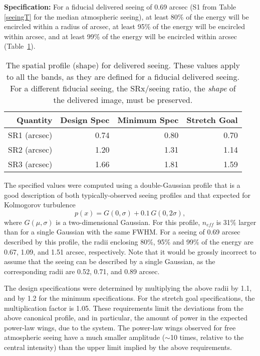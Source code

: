 {\bf Specification:} For a fiducial delivered seeing of 0.69 arcsec
(S1 from Table \ref{seeingT} for the median atmospheric seeing), at least 80\%
of the energy will be encircled within a radius of
arcsec, at least 95\% of the energy will be encircled within
arcsec, and at least 99\% of the energy will be encircled within
arcsec
(Table~\ref{Tspatprof}).

\begin{table}[h]
\begin{tabular}{|r|r|r|r|}
\hline
       Quantity    & Design Spec & Minimum Spec & Stretch Goal \\
\hline
      SR1 (arcsec) &    0.74       &   0.80       &   0.70        \\
      SR2 (arcsec) &    1.20       &   1.31       &   1.14        \\
      SR3 (arcsec) &    1.66       &   1.81       &   1.59        \\
\hline
\end{tabular}
\caption{The spatial profile (shape) for delivered seeing. These values
  apply to all the bands, as they are defined for a
  fiducial delivered seeing. For a different fiducial seeing, the
  SRx/seeing ratio, \ie the {\it shape} of the delivered image,
  must be preserved.}
\label{Tspatprof}
\end{table}

The specified values were computed using a double-Gaussian profile that is
a good description of both typically-observed seeing profiles and that
expected for Kolmogorov turbulence
\begin{equation}
       p(x) = G(0,\sigma) + 0.1\, G(0,2\sigma),
\end{equation}
where $G(\mu,\sigma)$ is a two-dimensional Gaussian. For this profile,
$n_{eff}$ is 31\% larger than for a single Gaussian with the same FWHM. For
a seeing of 0.69 arcsec described by this profile, the radii enclosing
80\%, 95\% and 99\% of the energy are 0.67, 1.09, and 1.51 arcsec,
respectively. Note that it would be grossly incorrect to assume that the
seeing can be described by a single Gaussian, as the corresponding radii
are 0.52, 0.71, and 0.89 arcsec.

The design specifications were determined by multiplying the above radii by
1.1, and by 1.2 for the minimum specifications.  For the stretch goal
specifications, the multiplication factor is 1.05.  These requirements
limit the deviations from the above canonical profile, and in particular,
the amount of power in the expected power-law wings, due to the system. The
power-law wings observed for free atmospheric seeing have a much smaller
amplitude ($\sim$10 times, relative to the central intensity) than the
upper limit implied by the above requirements.


